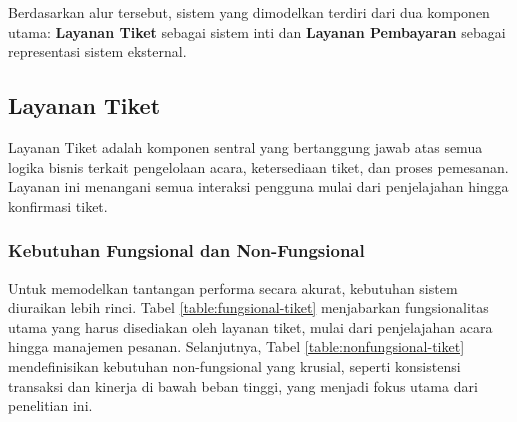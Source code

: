 Berdasarkan alur tersebut, sistem yang dimodelkan terdiri dari dua komponen utama: \textbf{Layanan Tiket} sebagai sistem inti dan \textbf{Layanan Pembayaran} sebagai representasi sistem eksternal.

\subsection{Layanan Tiket}

Layanan Tiket adalah komponen sentral yang bertanggung jawab atas semua logika bisnis terkait pengelolaan acara, ketersediaan tiket, dan proses pemesanan. Layanan ini menangani semua interaksi pengguna mulai dari penjelajahan hingga konfirmasi tiket.

\subsubsection{Kebutuhan Fungsional dan Non-Fungsional}

Untuk memodelkan tantangan performa secara akurat, kebutuhan sistem diuraikan lebih rinci. Tabel \ref{table:fungsional-tiket} menjabarkan fungsionalitas utama yang harus disediakan oleh layanan tiket, mulai dari penjelajahan acara hingga manajemen pesanan. Selanjutnya, Tabel \ref{table:nonfungsional-tiket} mendefinisikan kebutuhan non-fungsional yang krusial, seperti konsistensi transaksi dan kinerja di bawah beban tinggi, yang menjadi fokus utama dari penelitian ini.

\pagebreak

